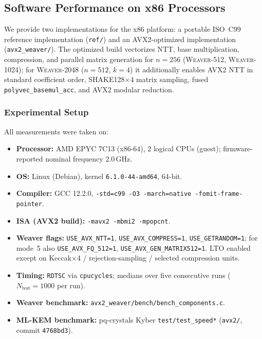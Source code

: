 
\subsection{Software Performance on x86 Processors}
We provide two implementations for the x86 platform: a portable ISO~C99 reference implementation (\texttt{ref/}) and an AVX2-optimized implementation (\texttt{avx2\_weaver/}). The optimized build vectorizes NTT, base multiplication, compression, and parallel matrix generation for $n{=}256$ (\textsc{Weaver-512}, \textsc{Weaver-1024}); for \textsc{Weaver-2048} ($n{=}512$, $k{=}4$) it additionally enables AVX2 NTT in standard coefficient order, SHAKE128$\times$4 matrix sampling, fused \texttt{polyvec\_basemul\_acc}, and AVX2 modular reduction.

\subsubsection{Experimental Setup}
All measurements were taken on:
\begin{itemize}
  \item \textbf{Processor:} AMD EPYC 7C13 (x86-64), 2 logical CPUs (guest); firmware-reported nominal frequency 2.0\,GHz.
  \item \textbf{OS:} Linux (Debian), kernel \texttt{6.1.0-44-amd64}, 64-bit.
  \item \textbf{Compiler:} GCC 12.2.0, \texttt{-std=c99 -O3 -march=native -fomit-frame-pointer}.
  \item \textbf{ISA (AVX2 build):} \texttt{-mavx2 -mbmi2 -mpopcnt}.
  \item \textbf{Weaver flags:} \texttt{USE\_AVX\_NTT=1}, \texttt{USE\_AVX\_COMPRESS=1}, \texttt{USE\_GETRANDOM=1}; for mode~5 also \texttt{USE\_AVX\_FQ\_512=1}, \texttt{USE\_AVX\_GEN\_MATRIX512=1}. LTO enabled except on Keccak$\times$4 / rejection-sampling / selected compression units.
  \item \textbf{Timing:} \texttt{RDTSC} via \texttt{cpucycles}; medians over five consecutive runs ($N_{\mathrm{test}}{=}1000$ per run).
  \item \textbf{Weaver benchmark:} \texttt{avx2\_weaver/bench/bench\_components.c}.
  \item \textbf{ML-KEM benchmark:} pq-crystals Kyber \texttt{test/test\_speed*} (\texttt{avx2/}, commit \texttt{4768bd3}).
\end{itemize}

